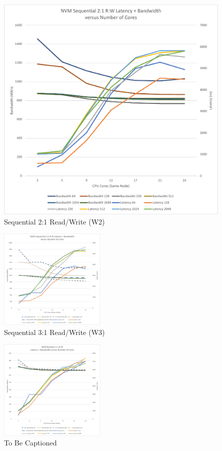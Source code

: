 \begin{figure}
    \centering
    \caption{Sequential 2:1 Read/Write (W2)}\label{chart:sequential:w2}
    \includegraphics[width=1.25\textwidth,trim=3cm 0 0 0]{charts/sequential-w2-crop.pdf}
\end{figure}

\begin{figure}
    {\centering
    \caption{Sequential 3:1 Read/Write (W3)}\label{chart:sequential:w3}
    \includegraphics[width=0.45\textwidth]{charts/sequential-w3-crop.pdf}
    }
\end{figure}



\begin{figure}
    \centering
    \caption{To Be Captioned} %
    \includegraphics[width=0.45\textwidth]{charts/random-w5-crop.pdf}
\end{figure}





